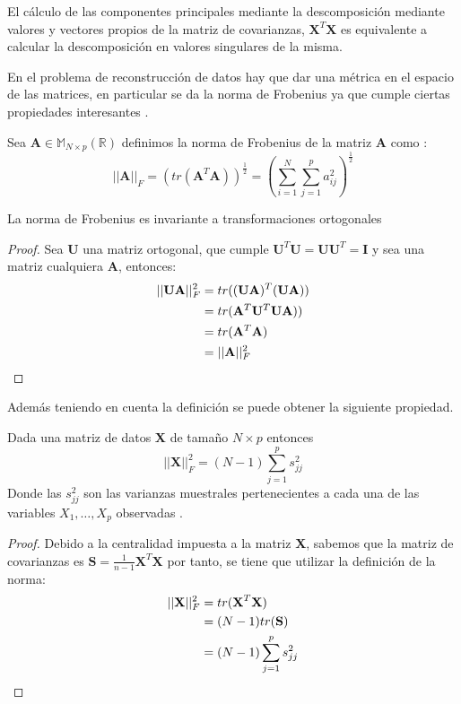 \begin{coro}
El cálculo de las componentes principales mediante la descomposición mediante valores y vectores propios de la matriz de covarianzas, $\mathbf{X}^T\mathbf{X}$ es equivalente a calcular la descomposición en valores singulares de la misma. 
\end{coro}

\noindent En el problema de reconstrucción de datos hay que dar una métrica en el espacio de las matrices, en particular se da la norma de Frobenius ya que cumple ciertas propiedades interesantes \cite{Golub 1987}.

\begin{defi}
Sea $\textbf{A}\in \mathbb{M}_{N\times p}(\mathbb{R})$ definimos la norma de Frobenius de la matriz \textbf{A} como :
\begin{equation}
||\textbf{A}||_F=(tr(\textbf{A}^T \textbf{A}))^{\frac{1}{2}}=\left(\sum_{i=1}^{N}\sum _{j=1}^{p}a_{ij}^2\right)^{\frac{1}{2}}
\end{equation}
\end{defi}

\begin{propo}
La norma de Frobenius es invariante a transformaciones ortogonales
\begin{proof}
Sea $\mathbf{U}$ una matriz ortogonal, que cumple $\mathbf{U}^T \mathbf{U}=\mathbf{U} \mathbf{U}^T=\textbf{I}$ y  sea una matriz cualquiera $\mathbf{A}$, entonces:
\begin{align*}
||\mathbf{U}  \mathbf{A}||_F^2&=tr((\mathbf{U} \mathbf{A})^T(\mathbf{U} \mathbf{A}))\\
&=tr(\mathbf{A}^T \mathbf{U}^T \mathbf{U} \mathbf{A}))\\
&=tr(\mathbf{A}^T \mathbf{A})\\
&=||\mathbf{A}||_F^2\qedhere
\end{align*}
\end{proof}
\end{propo}

\noindent Además teniendo en cuenta la definición se puede obtener la siguiente propiedad.

\begin{propo}
Dada una matriz de datos \textbf{X} de tamaño $N\times p$ entonces
\begin{equation}
||\textbf{X}||_F^2=(N-1)\sum_{j=1}^p s_{jj}^2
\end{equation}
Donde las $s_{jj}^2$ son las varianzas muestrales pertenecientes a cada una de las variables $X_1,\ldots,X_p$ observadas .
\begin{proof}
Debido a la centralidad impuesta a la matriz \textbf{X}, sabemos que la matriz de covarianzas es $\textbf{S}=\frac{1}{n-1}\textbf{X}^T \textbf{X}$ por tanto, se tiene que utilizar la definición de la norma:
\begin{align*}
||\textbf{X}||_F^2 &= tr(\textbf{X}^T\textbf{X})\\
&= (N-1) tr(\textbf{S})\\
&= (N-1) \sum_{j=1}^p s_{jj}^2 \qedhere
\end{align*}
\end{proof}
\end{propo}

